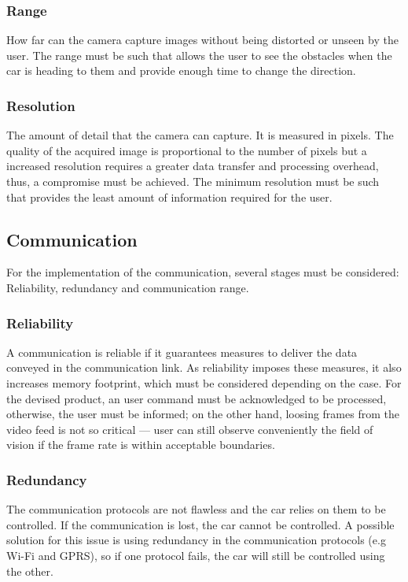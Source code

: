 \subsubsection{Range}%
\label{sec:orgecb044c}
How far can the camera capture images without being distorted or unseen by the user. The range must be such that allows the user to see the obstacles when the car is heading to them and provide enough time to change the direction.
\subsubsection{Resolution}%
\label{sec:orgba87554}%
The amount of detail that the camera can capture. It is measured in pixels. The quality of the acquired image is proportional to the number of pixels but a increased resolution requires a greater data transfer and processing overhead, thus, a compromise must be achieved. The minimum resolution must be such that provides the least amount of information required for the user. 
\subsection{Communication}%
\label{sec:org4241610}
For the implementation of the communication, several stages must be considered: Reliability, redundancy and communication range.
\subsubsection{Reliability}%
\label{sec:orgdcb920d}	
A communication is reliable if it guarantees measures to deliver the data
conveyed in the communication link. As reliability imposes these measures, it
also increases memory footprint, which must be considered
depending on the case. For the devised product, an user command
must be acknowledged to be processed, otherwise, the user must be informed; on
the other hand, loosing frames from the video feed is not so critical — user can
still observe conveniently the ﬁeld of vision if the frame rate is within
acceptable boundaries.
\subsubsection{Redundancy}
\label{sec:orgc5933fc}
The communication protocols are not flawless and the car relies on them to be controlled. If the communication is lost, the car cannot be controlled. A possible solution for this issue is using redundancy in the communication protocols (e.g Wi-Fi and GPRS), so if one protocol fails, the car will still be controlled using the other.
